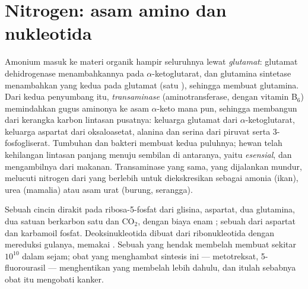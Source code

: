 \section{Nitrogen: asam amino dan nukleotida}

\begin{definition}\label{def:b1:biosyntheses-integration:nitrogen}
Amonium masuk ke materi organik hampir seluruhnya lewat
\emph{glutamat}: glutamat dehidrogenase menambahkannya pada
$\alpha$-ketoglutarat, dan glutamina sintetase menambahkan yang kedua
pada  glutamat (satu ), sehingga membuat glutamina.
Dari kedua penyumbang itu, \emph{transaminase} (aminotransferase,
dengan  vitamin B$_6$) memindahkan gugus aminonya ke asam
$\alpha$-keto mana pun, sehingga membangun  dari kerangka
karbon lintasan pusatnya: keluarga glutamat dari
$\alpha$-ketoglutarat, keluarga aspartat dari oksaloasetat, alanina dan
serina dari piruvat serta 3-fosfogliserat. Tumbuhan dan bakteri membuat
kedua puluhnya; hewan telah kehilangan lintasan panjang menuju sembilan
di antaranya, yaitu  \emph{esensial}, dan mengambilnya dari
makanan. Transaminase yang sama, yang dijalankan mundur, melucuti
nitrogen dari  yang berlebih untuk diekskresikan sebagai
amonia (ikan), urea (mamalia) atau asam urat (burung, serangga).
\end{definition}

\begin{example}[Nukleotida]\label{ex:b1:biosyntheses-integration:nucleotides}
Sebuah cincin  dirakit pada ribosa-5-fosfat dari glisina,
aspartat, dua glutamina, dua satuan berkarbon satu dan $\mathrm{CO_2}$,
dengan biaya enam ; sebuah  dari aspartat dan karbamoil
fosfat. Deoksinukleotida dibuat dari ribonukleotida dengan mereduksi
gulanya, memakai . Sebuah  yang hendak membelah membuat sekitar
$10^{10}$  dalam sejam; obat yang menghambat sintesis ini ---
metotreksat, 5-fluorourasil --- menghentikan  yang membelah lebih
dahulu, dan itulah sebabnya obat itu mengobati kanker.
\end{example}

